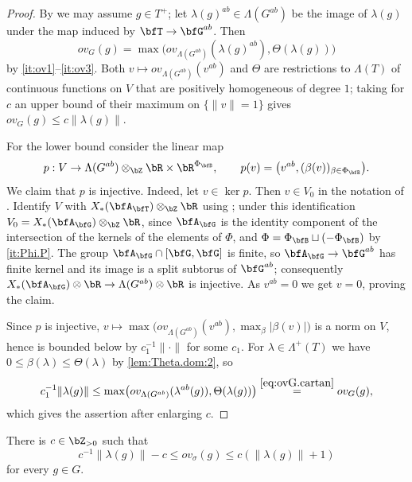 \documentclass[12pt,a4paper]{amsart}%
\newcommand{\RamiC}[1]{{{#1}}}
\begin{document}
\begin{proof}
By  we may assume $g\in T^+$; %
let
$\RamiC{\lambda(g)}^{ab}\in\Lambda(G^{ab})$ be \RamiC{the image of ${\lambda(g)}$}  under the map induced by $\bfT\to\bfG^{ab}$. Then
\begin{equation}\label{eq:ovG.cartan}
ov_G(g)=\max\bigl(ov_{\Lambda(G^{ab})}(\RamiC{\lambda(g)}^{ab}),\Theta(\RamiC{\lambda(g)})\bigr)
\end{equation}
by \eqref{it:ov1}--\eqref{it:ov3}. Both
$v\mapsto ov_{\Lambda(G^{ab})}(v^{ab})$ and $\Theta$ are restrictions to $\Lambda(T)$ of continuous
functions on $V$ that are positively homogeneous of degree $1$; taking for $c$ an upper bound of
their maximum on $\{\|v\|=1\}$ gives $ov_G(g)\leq c\|\RamiC{\lambda(g)}\|$.

For the lower bound consider the linear map
$$
p:V\to \Lambda(G^{ab})\otimes_\Z\R\times\R^{\Phi_\bfB},\qquad
p(v)=\bigl(v^{ab},(\beta(v))_{\beta\in\Phi_\bfB}\bigr).
$$
We claim that $p$ is injective. Indeed, let $v\in\ker p$. Then $v\in V_0$ in the notation of
. Identify $V$ with $X_*(\bfA_\bfT)\otimes_\Z\R$ using \cite[V.2.6]{Ren}; under
this identification $V_0=X_*(\bfA_\bfG)\otimes_\Z\R$, since $\bfA_\bfG$ is the identity component of
the intersection of the kernels of the elements of $\Phi$, and $\Phi=\Phi_\bfB\sqcup(-\Phi_\bfB)$
by \eqref{it:Phi.P}. The group $\bfA_\bfG\cap[\bfG,\bfG]$ is finite, so
$\bfA_\bfG\to\bfG^{ab}$ has finite kernel and its image is a split subtorus of $\bfG^{ab}$;
consequently $X_*(\bfA_\bfG)\otimes\R\to\Lambda(G^{ab})\otimes\R$ is injective. As $v^{ab}=0$ we
get $v=0$, proving the claim.

Since $p$ is injective, $v\mapsto\max\bigl(ov_{\Lambda(G^{ab})}(v^{ab}),\max_\beta|\beta(v)|\bigr)$
is a norm on $V$, hence is bounded below by $c_1^{-1}\|\cdot\|$ for some $c_1$. For
$\lambda\in\Lambda^+(T)$ we have $0\leq\beta(\lambda)\leq \Theta(\lambda)$ by
\eqref{lem:Theta.dom:2}, so
$$
c_1^{-1}\|\lambda\RamiC{(g)}\|\leq
\max\bigl(ov_{\Lambda(G^{ab})}(\lambda^{ab} \RamiC{(g)}),\Theta(\lambda\RamiC{(g)})\bigr)
\overset{\eqref{eq:ovG.cartan}}{=} ov_G(g),
$$
which gives the assertion after enlarging $c$.
\end{proof}

\begin{lemma}\label{lem:ov.sigma.comp}
There is $c\in\Z_{>0}$ such that
$$c^{-1}\|\lambda(g)\|-c\leq ov_\sigma(g)\leq c(\|\lambda(g)\|+1)$$ for every $g\in G$.
\end{lemma}
\end{document}
